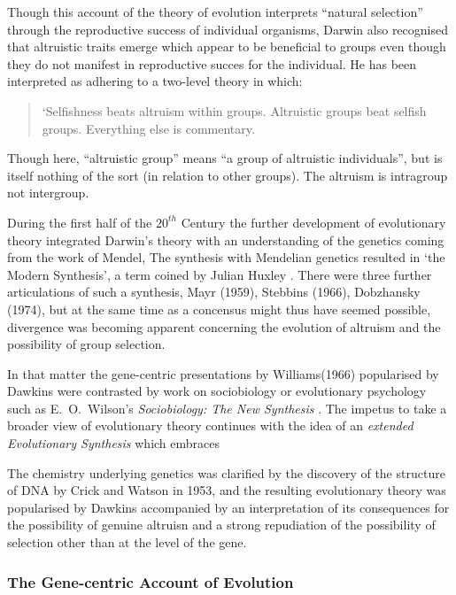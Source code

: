\documentclass[10pt,titlepage]{article}
\begin{document}
Though this account of the theory of evolution interprets ``natural selection'' through the reproductive success of individual organisms, Darwin also recognised that altruistic traits emerge which appear to be beneficial to groups even though they do not manifest in reproductive succes for the individual.
He has been interpreted as adhering to a two-level theory in which:

\begin{quote}
`Selfishness beats altruism within groups.
Altruistic groups beat selfish groups.
Everything else is commentary.
\end{quote}
\cite{wilson2007rethinking,wilson2015does}

Though here, ``altruistic group'' means ``a group of altruistic individuals'', but is itself nothing of the sort (in relation to other groups).
The altruism is intragroup not intergroup.

During the first half of the $20^{th}$ Century the further development of evolutionary theory integrated Darwin's theory with an understanding of the genetics coming from the work of Mendel,
The synthesis with Mendelian genetics resulted in `the Modern Synthesis', a term coined by Julian Huxley \cite{huxley-tms}.
There were three further articulations of such a synthesis, Mayr (1959), Stebbins (1966), Dobzhansky (1974), but at the same time as a concensus might thus have seemed possible, divergence was becoming apparent concerning the evolution of altruism and the possibility of group selection.

In that matter the gene-centric presentations by Williams(1966) \cite{williams-ans} popularised by Dawkins \cite{dawkinsSG} were contrasted by work on sociobiology or evolutionary psychology such as E.~O.~Wilson's \emph{Sociobiology: The New Synthesis} \cite{wilson-stns}.
The impetus to take a broader view of evolutionary theory continues with the idea of an \emph{extended Evolutionary Synthesis} which embraces 

The chemistry underlying genetics was clarified by the discovery of the structure of DNA by Crick and Watson in 1953, and the resulting evolutionary theory was popularised by Dawkins accompanied by an interpretation of its consequences for the possibility of genuine altruisn \cite{dawkinsSG} and a strong repudiation of the possibility of selection other than at the level of the gene.

\subsubsection{The Gene-centric Account of Evolution}
\end{document}
